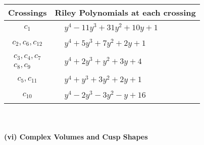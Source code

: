 \documentclass[1p]{elsarticle_modified}
\theoremstyle{definition}
\begin{document}
\begin{tabular}{m{50pt}|m{274pt}}
Crossings & \hspace{64pt}Riley Polynomials at each crossing \\
\hline $$\begin{aligned}c_{1}\end{aligned}$$&$\begin{aligned}
&y^4-11 y^3+31 y^2+10 y+1
\end{aligned}$\\
\hline $$\begin{aligned}c_{2},c_{6},c_{12}\end{aligned}$$&$\begin{aligned}
&y^4+5 y^3+7 y^2+2 y+1
\end{aligned}$\\
\hline $$\begin{aligned}c_{3},c_{4},c_{7}\\c_{8},c_{9}\end{aligned}$$&$\begin{aligned}
&y^4+2 y^3+y^2+3 y+4
\end{aligned}$\\
\hline $$\begin{aligned}c_{5},c_{11}\end{aligned}$$&$\begin{aligned}
&y^4+y^3+3 y^2+2 y+1
\end{aligned}$\\
\hline $$\begin{aligned}c_{10}\end{aligned}$$&$\begin{aligned}
&y^4-2 y^3-3 y^2- y+16
\end{aligned}$\\
\hline
\end{tabular}\\~\\
\newpage\flushleft \textbf{(vi) Complex Volumes and Cusp Shapes}
\end{document}
